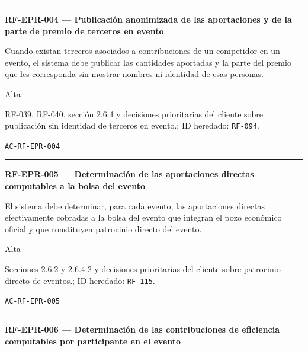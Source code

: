 \documentclass[10pt,letterpaper]{article}
\begin{document}
\vspace{0.25em}\hrule\vspace{0.65em}
\noindent\textbf{RF-EPR-004 --- Publicación anonimizada de las aportaciones y de la parte de premio de terceros en evento}\par
\begin{description}[style=nextline,leftmargin=3.15cm,labelwidth=2.8cm,font=\normalfont\bfseries]
\item[Obligación] Cuando existan terceros asociados a contribuciones de un competidor en un evento, el sistema debe publicar las cantidades aportadas y la parte del premio que les corresponda sin mostrar nombres ni identidad de esas personas.
\item[Prioridad] Alta
\item[Procedencia] RF-039, RF-040, sección 2.6.4 y decisiones prioritarias del cliente sobre publicación sin identidad de terceros en evento.; ID heredado: \texttt{RF-094}.
\item[Verificación] \texttt{AC-RF-EPR-004}
\end{description}
\vspace{0.25em}\hrule\vspace{0.65em}
\noindent\textbf{RF-EPR-005 --- Determinación de las aportaciones directas computables a la bolsa del evento}\par
\begin{description}[style=nextline,leftmargin=3.15cm,labelwidth=2.8cm,font=\normalfont\bfseries]
\item[Obligación] El sistema debe determinar, para cada evento, las aportaciones directas efectivamente cobradas a la bolsa del evento que integran el pozo económico oficial y que constituyen patrocinio directo del evento.
\item[Prioridad] Alta
\item[Procedencia] Secciones 2.6.2 y 2.6.4.2 y decisiones prioritarias del cliente sobre patrocinio directo de eventos.; ID heredado: \texttt{RF-115}.
\item[Verificación] \texttt{AC-RF-EPR-005}
\end{description}
\vspace{0.25em}\hrule\vspace{0.65em}
\noindent\textbf{RF-EPR-006 --- Determinación de las contribuciones de eficiencia computables por participante en el evento}\par
\end{document}

